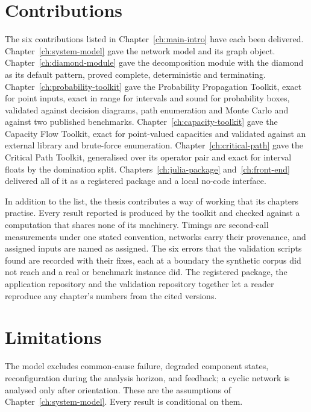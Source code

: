 \documentclass[12pt]{report}
\begin{document}
\section{Contributions}
\label{sec:concl-contributions}

The six contributions listed in Chapter~\ref{ch:main-intro} have each been delivered.
Chapter~\ref{ch:system-model} gave the network model and its graph object.
Chapter~\ref{ch:diamond-module} gave the decomposition module with the diamond as its
default pattern, proved complete, deterministic and terminating.
Chapter~\ref{ch:probability-toolkit} gave the Probability Propagation Toolkit, exact for
point inputs, exact in range for intervals and sound for probability boxes, validated
against decision diagrams, path enumeration and Monte Carlo and against two published
benchmarks. Chapter~\ref{ch:capacity-toolkit} gave the Capacity Flow Toolkit, exact for
point-valued capacities and validated against an external library and brute-force
enumeration. Chapter~\ref{ch:critical-path} gave the Critical Path Toolkit, generalised
over its operator pair and exact for interval floats by the domination split.
Chapters~\ref{ch:julia-package} and~\ref{ch:front-end} delivered all of it as a registered
package and a local no-code interface.

In addition to the list, the thesis contributes a way of working that its chapters practise.
Every result reported is produced by the toolkit and checked against a computation that
shares none of its machinery. Timings are second-call measurements under one stated
convention, networks carry their provenance, and assigned inputs are named as assigned. The six errors that the validation scripts found are recorded with their fixes,
each at a boundary the synthetic corpus did not reach and a real or benchmark instance did.
The registered package, the application repository and the validation
repository together let a reader reproduce any chapter's numbers from the cited versions.

\section{Limitations}
\label{sec:concl-limitations}

The model excludes common-cause failure, degraded component states, reconfiguration during
the analysis horizon, and feedback; a cyclic network is analysed only after orientation.
These are the assumptions of Chapter~\ref{ch:system-model}. Every result is conditional on
them.
\end{document}
